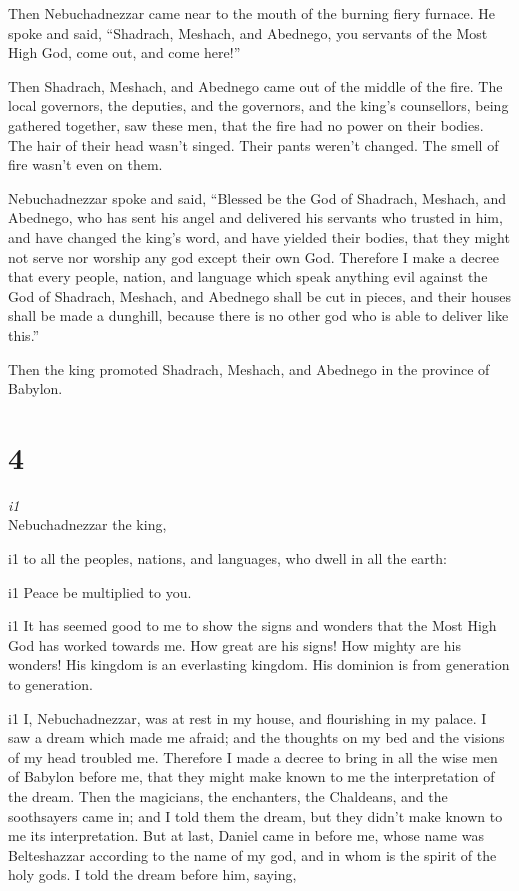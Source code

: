  Then Nebuchadnezzar came near to the mouth of the
burning fiery furnace. He spoke and said, ``Shadrach, Meshach, and
Abednego, you servants of the Most High God, come out, and come here!''

Then Shadrach, Meshach, and Abednego came out of the middle of the fire.
 The local governors, the deputies, and the governors,
and the king's counsellors, being gathered together, saw these men, that
the fire had no power on their bodies. The hair of their head wasn't
singed. Their pants weren't changed. The smell of fire wasn't even on
them.

 Nebuchadnezzar spoke and said, ``Blessed be the God of
Shadrach, Meshach, and Abednego, who has sent his angel and delivered
his servants who trusted in him, and have changed the king's word, and
have yielded their bodies, that they might not serve nor worship any god
except their own God.  Therefore I make a decree that
every people, nation, and language which speak anything evil against the
God of Shadrach, Meshach, and Abednego shall be cut in pieces, and their
houses shall be made a dunghill, because there is no other god who is
able to deliver like this.''

 Then the king promoted Shadrach, Meshach, and Abednego
in the province of Babylon.

\hypertarget{section-3}{%
\section{4}\label{section-3}}

\emph{i1}\\
 Nebuchadnezzar the king,

i1 to all the peoples, nations, and languages, who dwell in all the
earth:

i1 Peace be multiplied to you.

i1  It has seemed good to me to show the signs and wonders
that the Most High God has worked towards me.  How great
are his signs! How mighty are his wonders! His kingdom is an everlasting
kingdom. His dominion is from generation to generation.

i1  I, Nebuchadnezzar, was at rest in my house, and
flourishing in my palace.  I saw a dream which made me
afraid; and the thoughts on my bed and the visions of my head troubled
me.  Therefore I made a decree to bring in all the wise
men of Babylon before me, that they might make known to me the
interpretation of the dream.  Then the magicians, the
enchanters, the Chaldeans, and the soothsayers came in; and I told them
the dream, but they didn't make known to me its interpretation.
 But at last, Daniel came in before me, whose name was
Belteshazzar according to the name of my god, and in whom is the spirit
of the holy gods. I told the dream before him, saying,

